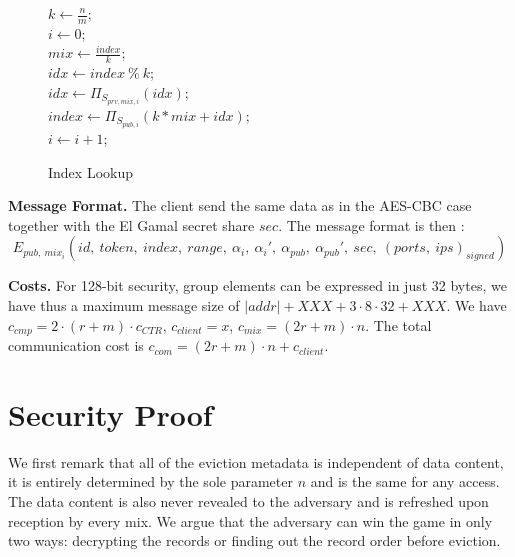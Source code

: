 \documentclass{llncs}
\begin{document}
\begin{figure}
\centering
\begin{minipage}{0.5\textwidth}
\begin{algorithm}[H]
\DontPrintSemicolon
{}
$k \gets \frac{n}{m}$;\\
$i \gets 0$;\\
{
	$mix \gets \frac{index}{k} $;\\
	$idx \gets index\ \%\ k$;\\
	$idx \gets {\Pi}_{S_{prv, mix, i}}(idx) $;\\
	$index \gets {\Pi}_{S_{pub, i}}(k*mix+idx)$;\\
	$i\gets i+1$;
}
\caption{Index Lookup}
\label{alg:IAS}
\end{algorithm}
\end{minipage}
\end{figure}
\fi

\noindent\textbf{Message Format.}
The client send the same data as in the AES-CBC case together with the El Gamal secret share $sec$.
The message format is then : $$E_{pub,\ mix_i}\left (id,\ token,\ index,\ range,\ \alpha_i,\ \alpha_i',\ \alpha_{pub},\ \alpha_{pub}',\ sec,\ (ports,\ ips)_{signed}\right )$$

\noindent\textbf{Costs.} For 128-bit security, group elements can be expressed in just 32 bytes, we have thus a maximum message size of $|addr|+XXX + 3 \cdot 8 \cdot 32 + XXX$. We have $c_{cmp} = 2\cdot (r+m) \cdot c_{CTR} $, $c_{client}=x$, $c_{mix}= (2r+m)\cdot n$. The total communication cost is $c_{com}= (2r+m)\cdot n + c_{client}$.

\section{Security Proof}\label{Security}

We first remark that all of the eviction metadata is independent of data content, it is entirely determined by the sole parameter $n$ and is the same for any access. The data content is also never revealed to the adversary and is refreshed upon reception by every mix.
We argue that the adversary can win the game in only two ways: decrypting the records or finding out the record order before eviction. 
\end{document}
